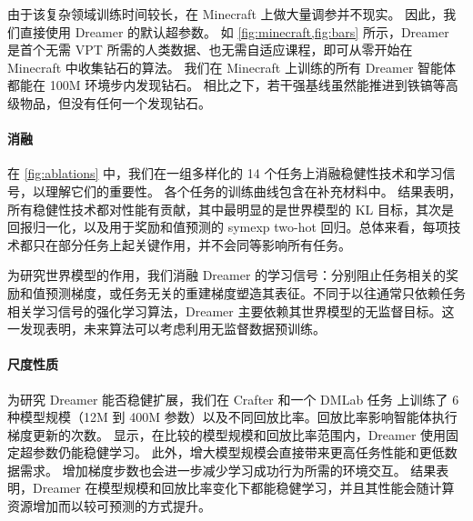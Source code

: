 由于该复杂领域训练时间较长，在 Minecraft 上做大量调参并不现实。
因此，我们直接使用 Dreamer 的默认超参数。
如 \cref{fig:minecraft,fig:bars} 所示，Dreamer 是首个无需 VPT 所需的人类数据\citep{baker2022vpt}、也无需自适应课程\citep{kanitscheider2021minecraftcurriculum}，即可从零开始在 Minecraft 中收集钻石的算法。
我们在 Minecraft 上训练的所有 Dreamer 智能体都能在 100M 环境步内发现钻石。
相比之下，若干强基线虽然能推进到铁镐等高级物品，但没有任何一个发现钻石。

\paragraph{消融}
在 \cref{fig:ablations} 中，我们在一组多样化的 14 个任务上消融稳健性技术和学习信号，以理解它们的重要性。
各个任务的训练曲线包含在补充材料中。
结果表明，所有稳健性技术都对性能有贡献，其中最明显的是世界模型的 KL 目标，其次是回报归一化，以及用于奖励和值预测的 symexp two-hot 回归。总体来看，每项技术都只在部分任务上起关键作用，并不会同等影响所有任务。

为研究世界模型的作用，我们消融 Dreamer 的学习信号：分别阻止任务相关的奖励和值预测梯度，或任务无关的重建梯度塑造其表征。不同于以往通常只依赖任务相关学习信号的强化学习算法\citep{mnih2015dqn,schrittwieser2019muzero}，Dreamer 主要依赖其世界模型的无监督目标。这一发现表明，未来算法可以考虑利用无监督数据预训练。

\paragraph{尺度性质}
为研究 Dreamer 能否稳健扩展，我们在 Crafter\citep{hafner2021crafter} 和一个 DMLab 任务\citep{beattie2016dmlab} 上训练了 6 种模型规模（12M 到 400M 参数）以及不同回放比率。回放比率影响智能体执行梯度更新的次数。
 显示，在比较的模型规模和回放比率范围内，Dreamer 使用固定超参数仍能稳健学习。
此外，增大模型规模会直接带来更高任务性能和更低数据需求。
增加梯度步数也会进一步减少学习成功行为所需的环境交互。
结果表明，Dreamer 在模型规模和回放比率变化下都能稳健学习，并且其性能会随计算资源增加而以较可预测的方式提升。
